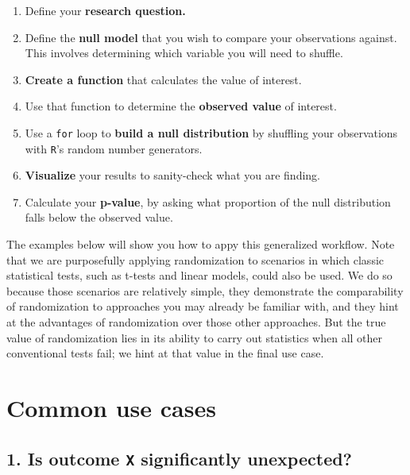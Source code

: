 \documentclass[]{book}
\begin{document}
\begin{enumerate}
\def\labelenumi{\arabic{enumi}.}
\item
  Define your \textbf{research question.}
\item
  Define the \textbf{null model} that you wish to compare your observations against. This involves determining which variable you will need to shuffle.
\item
  \textbf{Create a function} that calculates the value of interest.
\item
  Use that function to determine the \textbf{observed value} of interest.
\item
  Use a \texttt{for} loop to \textbf{build a null distribution} by shuffling your observations with \texttt{R}'s random number generators.
\item
  \textbf{Visualize} your results to sanity-check what you are finding.
\item
  Calculate your \textbf{p-value}, by asking what proportion of the null distribution falls below the observed value.
\end{enumerate}

The examples below will show you how to appy this generalized workflow. Note that we are purposefully applying randomization to scenarios in which classic statistical tests, such as t-tests and linear models, could also be used. We do so because those scenarios are relatively simple, they demonstrate the comparability of randomization to approaches you may already be familiar with, and they hint at the advantages of randomization over those other approaches. But the true value of randomization lies in its ability to carry out statistics when all other conventional tests fail; we hint at that value in the final use case.

\hypertarget{common-use-cases}{%
\section*{Common use cases}\label{common-use-cases}}

\hypertarget{is-outcome-x-significantly-unexpected}{%
\subsection*{\texorpdfstring{1. Is outcome \texttt{X} significantly unexpected?}{1. Is outcome X significantly unexpected?}}\label{is-outcome-x-significantly-unexpected}}
\end{document}
